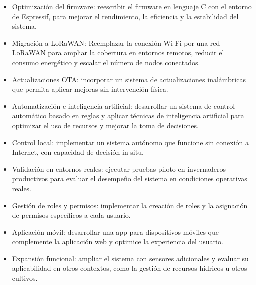 \begin{itemize}
      \item Optimización del firmware: reescribir el firmware en lenguaje C con el entorno
            de Espressif, para mejorar el rendimiento, la eficiencia y la estabilidad del
            sistema.
      \item Migración a LoRaWAN: Reemplazar la conexión Wi-Fi por una red LoRaWAN para
            ampliar la cobertura en entornos remotos, reducir el consumo energético y
            escalar el número de nodos conectados.

      \item Actualizaciones OTA: incorporar un sistema de actualizaciones inalámbricas que
            permita aplicar mejoras sin intervención física.

      \item Automatización e inteligencia artificial: desarrollar un sistema de control
            automático basado en reglas y aplicar técnicas de inteligencia artificial para
            optimizar el uso de recursos y mejorar la toma de decisiones.

      \item Control local: implementar un sistema autónomo que funcione sin conexión a
            Internet, con capacidad de decisión in situ.

      \item Validación en entornos reales: ejecutar pruebas piloto en invernaderos
            productivos para evaluar el desempeño del sistema en condiciones operativas
            reales.

      \item Gestión de roles y permisos: implementar la creación de roles y la asignación
            de permisos específicos a cada usuario.

      \item Aplicación móvil: desarrollar una app para dispositivos móviles que complemente
            la aplicación web y optimice la experiencia del usuario.

      \item Expansión funcional: ampliar el sistema con sensores adicionales y evaluar su
            aplicabilidad en otros contextos, como la gestión de recursos hídricos u otros
            cultivos.
\end{itemize}
